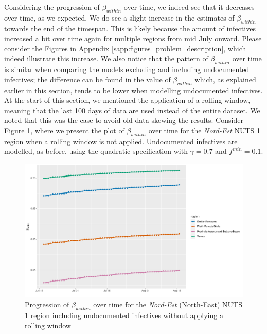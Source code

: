 \documentclass[12pt]{article}
\begin{document}
	Considering the progression of $\beta_{within}$ over time, we indeed see that it decreases over time, as we expected. We do see a slight increase in the estimates of $\beta_{within}$ towards the end of the timespan. This is likely because the amount of infectives increased a bit over time again for multiple regions from mid July onward. Please consider the Figures in Appendix \ref{sapp:figures_problem_description}, which indeed illustrate this increase. We also notice that the pattern of $\beta_{within}$ over time is similar when comparing the models excluding and including undocumented infectives; the difference can be found in the value of $\beta_{within}$ which, as explained earlier in this section, tends to be lower when modelling undocumented infectives. \\
	
	At the start of this section, we mentioned the application of a rolling window, meaning that the last 100 days of data are used instead of the entire dataset. We noted that this was the case to avoid old data skewing the results. Consider Figure \ref{fig:beta_within_over_time_nordest_not_rolling}, where we present the plot of $\beta_{within}$ over time for the \textit{Nord-Est} NUTS 1 region when a rolling window is not applied. Undocumented infectives are modelled, as before, using the quadratic specification with $\gamma = 0.7$ and $f^{min}=0.1$.
	
	\begin{figure}[H]
	    \centering
        \includegraphics[width=0.95\linewidth]{output/model_within_lag14_betawithin_Nord-Est_UndocQuadratic.pdf}
	    \caption{Progression of $\beta_{within}$ over time for the \textit{Nord-Est} (North-East) NUTS 1 region including undocumented infectives without applying a rolling window}
	    \label{fig:beta_within_over_time_nordest_not_rolling}
    \end{figure}
	
\end{document}
